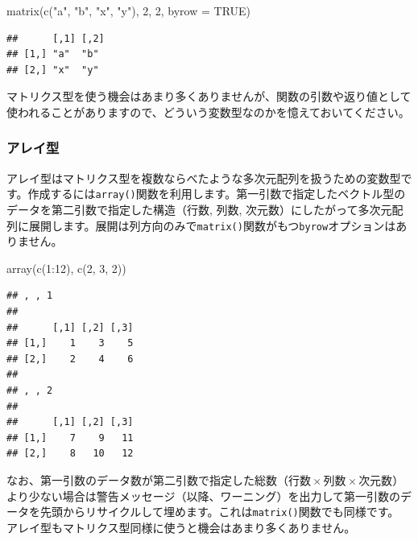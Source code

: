 \documentclass[
  12pt,
]{book}
\newenvironment{Shaded}{\begin{snugshade}}{\end{snugshade}}
\newcommand{\AttributeTok}[1]{\textcolor[rgb]{0.77,0.63,0.00}{#1}}
\newcommand{\ConstantTok}[1]{\textcolor[rgb]{0.00,0.00,0.00}{#1}}
\newcommand{\DecValTok}[1]{\textcolor[rgb]{0.00,0.00,0.81}{#1}}
\newcommand{\FunctionTok}[1]{\textcolor[rgb]{0.00,0.00,0.00}{#1}}
\newcommand{\NormalTok}[1]{#1}
\newcommand{\SpecialCharTok}[1]{\textcolor[rgb]{0.00,0.00,0.00}{#1}}
\newcommand{\StringTok}[1]{\textcolor[rgb]{0.31,0.60,0.02}{#1}}
\begin{document}
\begin{Shaded}
\begin{Highlighting}[numbers=left,,]
\FunctionTok{matrix}\NormalTok{(}\FunctionTok{c}\NormalTok{(}\StringTok{"a"}\NormalTok{, }\StringTok{"b"}\NormalTok{, }\StringTok{"x"}\NormalTok{, }\StringTok{"y"}\NormalTok{), }\DecValTok{2}\NormalTok{, }\DecValTok{2}\NormalTok{, }\AttributeTok{byrow =} \ConstantTok{TRUE}\NormalTok{)}
\end{Highlighting}
\end{Shaded}

\begin{verbatim}
##      [,1] [,2]
## [1,] "a"  "b" 
## [2,] "x"  "y"
\end{verbatim}

マトリクス型を使う機会はあまり多くありませんが、関数の引数や返り値として使われることがありますので、どういう変数型なのかを憶えておいてください。

\hypertarget{ux30a2ux30ecux30a4ux578b}{%
\subsubsection{アレイ型}\label{ux30a2ux30ecux30a4ux578b}}

アレイ型はマトリクス型を複数ならべたような多次元配列を扱うための変数型です。作成するには\texttt{array()}関数を利用します。第一引数で指定したベクトル型のデータを第二引数で指定した構造（行数, 列数, 次元数）にしたがって多次元配列に展開します。展開は列方向のみで\texttt{matrix()}関数がもつ\texttt{byrow}オプションはありません。

\begin{Shaded}
\begin{Highlighting}[numbers=left,,]
\FunctionTok{array}\NormalTok{(}\FunctionTok{c}\NormalTok{(}\DecValTok{1}\SpecialCharTok{:}\DecValTok{12}\NormalTok{), }\FunctionTok{c}\NormalTok{(}\DecValTok{2}\NormalTok{, }\DecValTok{3}\NormalTok{, }\DecValTok{2}\NormalTok{))}
\end{Highlighting}
\end{Shaded}

\begin{verbatim}
## , , 1
## 
##      [,1] [,2] [,3]
## [1,]    1    3    5
## [2,]    2    4    6
## 
## , , 2
## 
##      [,1] [,2] [,3]
## [1,]    7    9   11
## [2,]    8   10   12
\end{verbatim}

なお、第一引数のデータ数が第二引数で指定した総数（\(\mbox{行数} \times \mbox{列数} \times \mbox{次元数}\)）より少ない場合は警告メッセージ（以降、ワーニング）を出力して第一引数のデータを先頭からリサイクルして埋めます。これは\texttt{matrix()}関数でも同様です。 アレイ型もマトリクス型同様に使うと機会はあまり多くありません。
\end{document}
